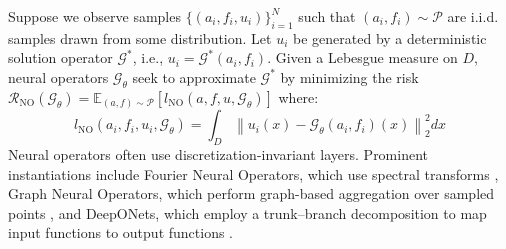 \documentclass{article} %
\begin{document}
Suppose we observe samples $\{(a_i, f_i, u_i)\}_{i = 1}^N$ such that $(a_i, f_i) \sim \mathcal{P}$ are i.i.d. samples drawn from some distribution. Let $u_i$ be generated by a deterministic solution operator $\mathcal{G}^{*}$, i.e., $u_i = \mathcal{G}^{*}(a_i, f_i)$. 
Given a Lebesgue measure on $D$, neural operators  $\mathcal{G}_{\theta}$ seek to approximate $\mathcal{G}^*$ by minimizing the risk  $\mathcal{R}_{\text{NO}}(\mathcal{G}_{\theta})  = \mathbb{E}_{(a, f) \sim  \mathcal{P}}\left[l_{\text{NO}}(a, f, u, \mathcal{G}_{\theta})\right]$ where:
\begin{equation} \label{eq:NOloss}
    l_{\text{NO}}(a_i, f_i, u_i, \mathcal{G}_{\theta}) = \int_{D} \left\|u_i(x) - \mathcal{G}_{\theta}(a_i, f_i)(x)\right\|_2^2dx
\end{equation}
Neural operators often use discretization-invariant layers. Prominent instantiations include Fourier Neural Operators, which use spectral transforms \citep{li2020fourier}, Graph Neural Operators, which perform graph-based aggregation over sampled points \citep{li2020multipole}, and DeepONets, which employ a trunk–branch decomposition to map input functions to output functions \citep{lu2021learning}. 



\end{document}
